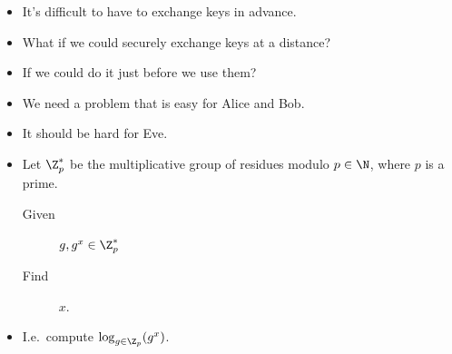 \begin{frame}
  \begin{idea}
    \begin{itemize}
      \item It's difficult to have to exchange keys in advance.

        \pause{}

      \item What if we could securely exchange keys at a distance?
      \item If we could do it just before we use them?
    \end{itemize}
  \end{idea}

%
\end{frame}

\begin{frame}
  \begin{solution}[Requirements]
    \begin{itemize}
      \item We need a problem that is easy for Alice and Bob.
      \item It should be hard for Eve.
    \end{itemize}
  \end{solution}
\end{frame}

\begin{frame}
  \begin{definition}
    \begin{itemize}
      \item Let \(\Z_p^*\) be the multiplicative group of residues modulo 
        \(p\in \N\), where \(p\) is a prime.

        \pause{}

        \begin{description}
          \item[Given] \(g, g^x\in \Z_p^*\)
          \item[Find] \(x\).
        \end{description}

      \item I.e.\ compute \(\log_{g\in \Z_p}(g^x)\).
    \end{itemize}
  \end{definition}
\end{frame}


